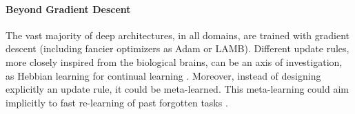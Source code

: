 \paragraph{Beyond Gradient Descent} The vast majority of deep architectures, in all domains, are
trained with gradient descent (including fancier optimizers as Adam or LAMB). Different update
rules, more closely inspired from the biological brains, can be an axis of investigation, as Hebbian
learning for continual learning \citep{taylor2020hebbiancontinual}. Moreover, instead of designing
explicitly an update rule, it could be meta-learned. This meta-learning could aim implicitly to
fast re-learning of past forgotten tasks \citep{he2019metacontinual,caccia2020osaka}.


